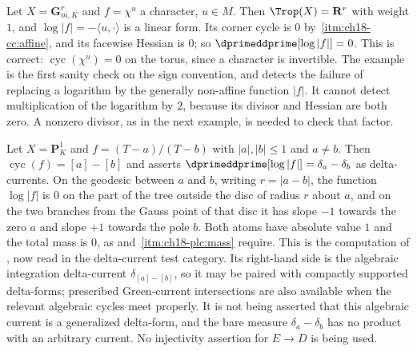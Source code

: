 \begin{example}
\label{ex:ch18-pl-character}
Let $X=\mathbf G_{m,K}^r$ and $f=\chi^u$ a character, $u\in M$.  Then
$\Trop(X)=\mathbf R^r$ with weight $1$, and
$\log|f|=-\langle u,\cdot\rangle$ is a linear form.  Its corner cycle is
$0$ by \,\cref{itm:ch18-cc:affine}, and its
facewise Hessian is $0$; so $\dprimeddprime[\log|f|]=0$.  This is correct:
$\operatorname{cyc}(\chi^u)=0$ on the torus, since a character is
invertible.  The example is the first sanity check on the sign convention,
and detects the failure of replacing a logarithm by the generally
non-affine function $|f|$.  It cannot detect multiplication of the logarithm
by $2$, because its divisor and Hessian are both zero.  A nonzero divisor,
as in the next example, is needed to check that factor.
\end{example}

\begin{example}
\label{ex:ch18-pl-p1}
Let $X=\mathbf P^1_K$ and $f=(T-a)/(T-b)$ with $|a|,|b|\leq1$ and
$a\neq b$.  Then $\operatorname{cyc}(f)=[a]-[b]$ and
 asserts
$\dprimeddprime[\log|f|]=\delta_a-\delta_b$ as delta-currents.  On the geodesic between $a$ and $b$, writing $r=|a-b|$, the function $\log|f|$ is
$0$ on the part of the tree outside the disc of radius $r$ about $a$, and on
the two branches from the Gauss point of that disc it has slope $-1$
towards the zero $a$ and slope $+1$ towards the pole $b$.  Both atoms have absolute value $1$
and the total mass is $0$, as  and
\,\cref{itm:ch18-plc:mass} require.  This is the
computation of , now read in the delta-current
test category.  Its right-hand side is the algebraic integration
delta-current $\delta_{[a]-[b]}$, so it may be paired with compactly
supported delta-forms; prescribed Green-current intersections are also
available when the relevant algebraic cycles meet properly.  It is not being
asserted that this algebraic current is a generalized delta-form, and the bare
measure $\delta_a-\delta_b$ has no product with an arbitrary current.  No
injectivity assertion for $E\to D$ is being used.
\end{example}

